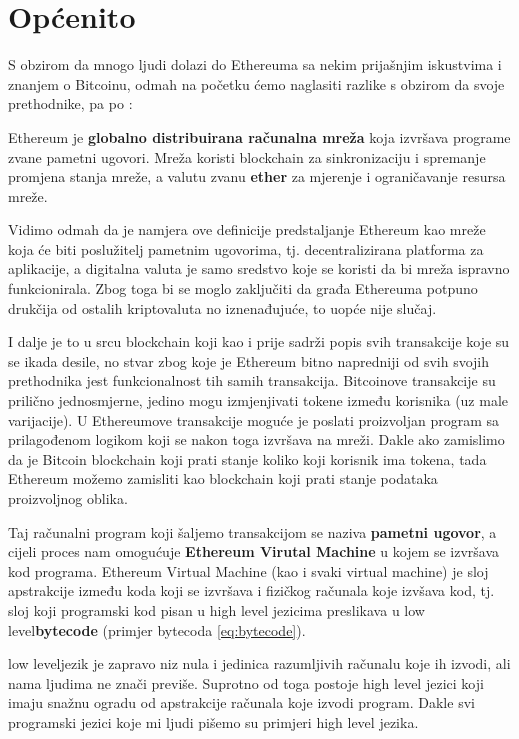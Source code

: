 \documentclass[a4paper,oneside,12pt]{memoir} %
\begin{document}
\section{Općenito}

S obzirom da mnogo ljudi dolazi do Ethereuma sa nekim prijašnjim iskustvima i znanjem o Bitcoinu, odmah na početku ćemo naglasiti razlike s obzirom da svoje prethodnike, pa po \cite{ethbook}:

\begin{definicija}
Ethereum je \textbf{globalno distribuirana računalna mreža} koja izvršava programe zvane pametni ugovori. Mreža koristi blockchain za sinkronizaciju i spremanje promjena stanja mreže, a valutu zvanu \textbf{ether} za mjerenje i ograničavanje resursa mreže.
\end{definicija}

Vidimo odmah da je namjera ove definicije predstaljanje Ethereum kao mreže koja će biti poslužitelj pametnim ugovorima, tj. decentralizirana platforma za aplikacije, a digitalna valuta je samo sredstvo koje se koristi da bi mreža ispravno funkcionirala. Zbog toga bi se moglo zaključiti da građa Ethereuma potpuno drukčija od ostalih kriptovaluta no iznenađujuće, to uopće nije slučaj.

I dalje je to u srcu blockchain koji kao i prije sadrži popis svih transakcije koje su se ikada desile, no stvar zbog koje je Ethereum bitno napredniji od svih svojih prethodnika jest funkcionalnost tih samih transakcija. Bitcoinove transakcije su prilično jednosmjerne, jedino mogu izmjenjivati tokene između korisnika (uz male varijacije). U Ethereumove transakcije moguće je poslati proizvoljan program sa prilagođenom logikom koji se nakon toga izvršava na mreži. Dakle ako zamislimo da je Bitcoin blockchain koji prati stanje koliko koji korisnik ima tokena, tada Ethereum možemo zamisliti kao blockchain koji prati stanje podataka proizvoljnog oblika.

Taj računalni program koji šaljemo transakcijom se naziva \textbf{pametni ugovor}, a cijeli proces nam omogućuje \textbf{Ethereum Virutal Machine} u kojem se izvršava kod programa. Ethereum Virtual Machine (kao i svaki virtual machine) je sloj apstrakcije između koda koji se izvršava i fizičkog računala koje izvšava kod, tj. sloj koji programski kod pisan u high level jezicima preslikava u low level\textbf{bytecode} (primjer bytecoda \ref{eq:bytecode}).

\begin{napomena}
low leveljezik je zapravo niz nula i jedinica razumljivih računalu koje ih izvodi, ali nama ljudima ne znači previše. Suprotno od toga postoje high level jezici koji imaju snažnu ogradu od apstrakcije računala koje izvodi program. Dakle svi programski jezici koje mi ljudi pišemo su primjeri high level jezika.
\end{napomena}
\end{document}
